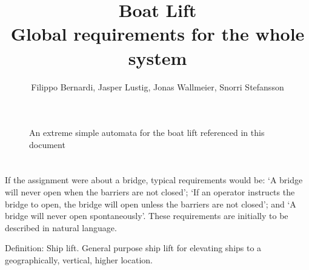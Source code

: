 \documentclass{article}
\begin{document}
\title{\huge{Boat Lift} \\ {\fontsize{13}{1} \selectfont Global requirements for the whole system} }
\author{Filippo Bernardi, Jasper Lustig, Jonas Wallmeier, Snorri Stefansson}

\maketitle



\vspace{3cm}

\begin{figure}[!h]
\centering

\caption{An extreme simple automata for the boat lift referenced in this document}
\end{figure}

\pagebreak

\section{}


If the assignment were about a bridge, typical requirements would be: ‘A bridge will never open when the barriers are not closed’; ‘If an operator instructs the bridge to open, the bridge will open unless the barriers are not closed’; and ‘A bridge will never open spontaneously’. These requirements are initially to be described in natural language. 

Definition:
Ship lift. General purpose ship lift for elevating ships to a geographically, vertical, higher location. 
\end{document}
